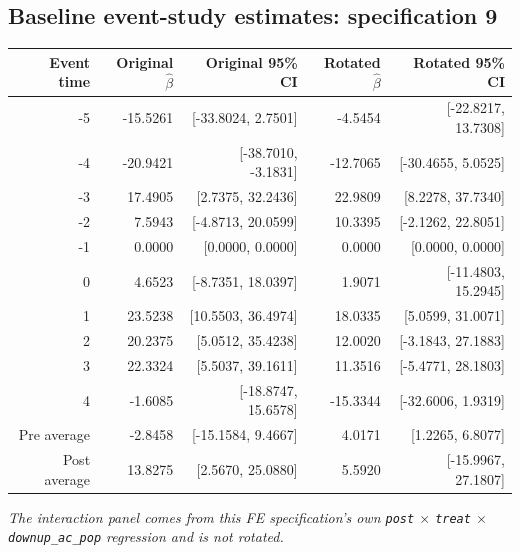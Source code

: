 \documentclass[10pt]{article}
\begin{document}
\subsection*{Baseline event-study estimates: specification 9}
\begin{center}
\scriptsize
\begin{tabular}{r rr rr}
\toprule
Event time & Original $\hat\beta$ & Original 95\% CI & Rotated $\hat\beta$ & Rotated 95\% CI \\
\midrule
-5 & -15.5261 & [-33.8024, 2.7501] & -4.5454 & [-22.8217, 13.7308] \\
-4 & -20.9421 & [-38.7010, -3.1831] & -12.7065 & [-30.4655, 5.0525] \\
-3 & 17.4905 & [2.7375, 32.2436] & 22.9809 & [8.2278, 37.7340] \\
-2 & 7.5943 & [-4.8713, 20.0599] & 10.3395 & [-2.1262, 22.8051] \\
-1 & 0.0000 & [0.0000, 0.0000] & 0.0000 & [0.0000, 0.0000] \\
0 & 4.6523 & [-8.7351, 18.0397] & 1.9071 & [-11.4803, 15.2945] \\
1 & 23.5238 & [10.5503, 36.4974] & 18.0335 & [5.0599, 31.0071] \\
2 & 20.2375 & [5.0512, 35.4238] & 12.0020 & [-3.1843, 27.1883] \\
3 & 22.3324 & [5.5037, 39.1611] & 11.3516 & [-5.4771, 28.1803] \\
4 & -1.6085 & [-18.8747, 15.6578] & -15.3344 & [-32.6006, 1.9319] \\
\midrule
Pre average & -2.8458 & [-15.1584, 9.4667] & 4.0171 & [1.2265, 6.8077] \\
Post average & 13.8275 & [2.5670, 25.0880] & 5.5920 & [-15.9967, 27.1807] \\
\bottomrule
\end{tabular}
\end{center}
\medskip
\textit{The interaction panel comes from this FE specification's own \texttt{post} $\times$ \texttt{treat} $\times$ \texttt{downup\_ac\_pop} regression and is not rotated.}
\clearpage
\end{document}
